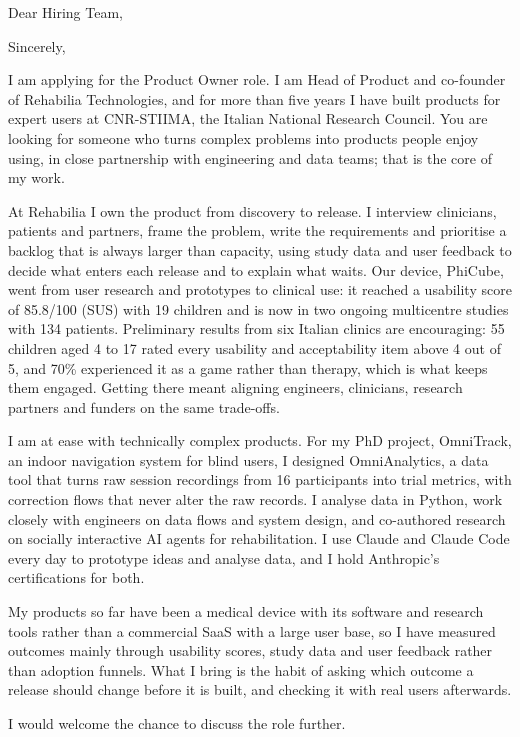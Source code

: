 \documentclass[11pt,a4paper,sans]{moderncv}
\begin{document}

\opening{Dear Hiring Team,}
\closing{Sincerely,}
\makelettertitle

I am applying for the Product Owner role. I am Head of Product and co-founder of Rehabilia Technologies, and for more than five years I have built products for expert users at CNR-STIIMA, the Italian National Research Council. You are looking for someone who turns complex problems into products people enjoy using, in close partnership with engineering and data teams; that is the core of my work.

At Rehabilia I own the product from discovery to release. I interview clinicians, patients and partners, frame the problem, write the requirements and prioritise a backlog that is always larger than capacity, using study data and user feedback to decide what enters each release and to explain what waits. Our device, PhiCube, went from user research and prototypes to clinical use: it reached a usability score of 85.8/100 (SUS) with 19 children and is now in two ongoing multicentre studies with 134 patients. Preliminary results from six Italian clinics are encouraging: 55 children aged 4 to 17 rated every usability and acceptability item above 4 out of 5, and 70\% experienced it as a game rather than therapy, which is what keeps them engaged. Getting there meant aligning engineers, clinicians, research partners and funders on the same trade-offs.

I am at ease with technically complex products. For my PhD project, OmniTrack, an indoor navigation system for blind users, I designed OmniAnalytics, a data tool that turns raw session recordings from 16 participants into trial metrics, with correction flows that never alter the raw records. I analyse data in Python, work closely with engineers on data flows and system design, and co-authored research on socially interactive AI agents for rehabilitation. I use Claude and Claude Code every day to prototype ideas and analyse data, and I hold Anthropic's certifications for both.

My products so far have been a medical device with its software and research tools rather than a commercial SaaS with a large user base, so I have measured outcomes mainly through usability scores, study data and user feedback rather than adoption funnels. What I bring is the habit of asking which outcome a release should change before it is built, and checking it with real users afterwards.

I would welcome the chance to discuss the role further.

\makeletterclosing
\end{document}
